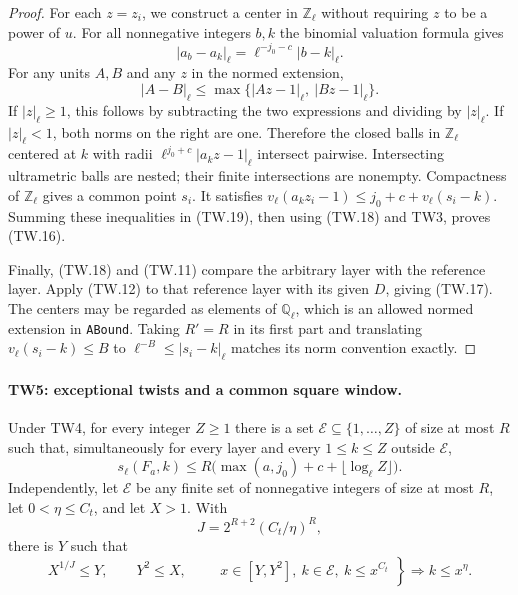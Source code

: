 \begin{proof}
For each $z=z_i$, we construct a center in $\mathbb Z_\ell$
without requiring $z$ to be a power of $u$.
For all nonnegative integers $b,k$ the binomial valuation
formula gives
\[
 |a_b-a_k|_\ell=\ell^{-j_0-c}|b-k|_\ell.
 \tag{TW.20}
\]
For any units $A,B$ and any $z$ in the normed extension,
\[
 |A-B|_\ell\le
       \max\{|Az-1|_\ell,\ |Bz-1|_\ell\}.
 \tag{TW.21}
\]
If $|z|_\ell\ge1$, this follows by subtracting the two
expressions and dividing by $|z|_\ell$.
If $|z|_\ell<1$, both norms on the right are one.
Therefore the closed balls in $\mathbb Z_\ell$ centered at
$k$ with radii $\ell^{j_0+c}|a_kz-1|_\ell$ intersect
pairwise.  Intersecting ultrametric balls are nested; their
finite intersections are nonempty.  Compactness of
$\mathbb Z_\ell$ gives a common point $s_i$.
It satisfies
$v_\ell(a_kz_i-1)\le j_0+c+v_\ell(s_i-k)$.
Summing these inequalities in (TW.19), then using (TW.18)
and TW3, proves (TW.16).

Finally, (TW.18) and (TW.11) compare the arbitrary layer with
the reference layer.  Apply (TW.12) to that reference layer
with its given $D$, giving (TW.17).
The centers may be regarded as elements of $\mathbb Q_\ell$,
which is an allowed normed extension in \texttt{ABound}.
Taking $R'=R$ in its first part and translating
$v_\ell(s_i-k)\le B$ to
$\ell^{-B}\le|s_i-k|_\ell$ matches its norm convention exactly.
\end{proof}

\paragraph{TW5: exceptional twists and a common square window.}
\label{claim:TW5}
Under TW4, for every integer $Z\ge1$ there is a set
$\mathcal E\subseteq\{1,\ldots,Z\}$ of size at most $R$
such that, simultaneously for every layer and every
$1\le k\le Z$ outside $\mathcal E$,
\[
 s_\ell(F_a,k)\le
 R\bigl(\max(a,j_0)+c+\lfloor\log_\ell Z\rfloor\bigr).
 \tag{TW.22}
\]
Independently, let $\mathcal E$ be any finite set of
nonnegative integers of size at most $R$, let
$0<\eta\le C_t$, and let $X>1$.  With
\[
                 J=2^{R+2}(C_t/\eta)^R,                \tag{TW.23}
\]
there is $Y$ such that
\[
 X^{1/J}\le Y,\qquad Y^2\le X,\qquad
 \left.
 \begin{array}{c}
 x\in[Y,Y^2],\ k\in\mathcal E,\ k\le x^{C_t}
 \end{array}\right\}
       \Longrightarrow k\le x^\eta .                  \tag{TW.24}
\]

